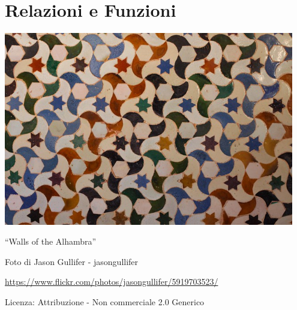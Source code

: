 \part{Relazioni e Funzioni}

\includegraphics[width=0.95\textwidth]{img/alhambra.jpg}
  \begin{center}
    {\large ``Walls of the Alhambra''}\par
    Foto di Jason Gullifer - jasongullifer\par
    \url{https://www.flickr.com/photos/jasongullifer/5919703523/}\par
    Licenza: Attribuzione - Non commerciale 2.0 Generico\par
  \end{center}
\clearpage
\cleardoublepage
